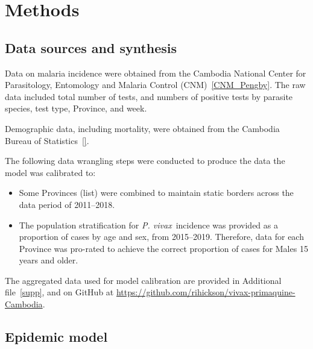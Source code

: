 \documentclass[doublespacing]{bmcart}
\newcommand{\pv}{\textit{P. vivax}}
\begin{document}
%
\section*{Methods} \label{sec:methods} %

\subsection*{Data sources and synthesis} 
Data on malaria incidence were obtained from the Cambodia National Center for Parasitology, Entomology and Malaria Control (CNM)~\ref{CNM_Pengby}. The raw data included total number of tests, and numbers of positive tests by parasite species, test type, Province, and week.

Demographic data, including mortality, were obtained from the Cambodia Bureau of Statistics~\ref{}. 

The following data wrangling steps were conducted to produce the data the model was calibrated to:
\begin{itemize}
    \item Some Provinces (list) were combined to maintain static borders across the data period of 2011--2018. 
    \item The population stratification for \pv~incidence was provided as a proportion of cases by age and sex, from 2015--2019. Therefore, data for each Province was pro-rated to achieve the correct proportion of cases for Males 15 years and older. 
\end{itemize}

The aggregated data used for model calibration are provided in Additional file~\ref{supp}, and on GitHub at \url{https://github.com/rihickson/vivax-primaquine-Cambodia}.  

\subsection*{Epidemic model}
\end{document}
